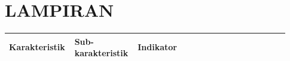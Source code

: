 
\appendix
\chapter*{LAMPIRAN}

\label{annex:kisi-kisi-instrumen}

\begin{longtable}{|p{0.2\linewidth}|p{0.2\linewidth}|p{0.53\linewidth}|}
      \hline
      \multicolumn{1}{|m{0.2\linewidth}|}{\textbf{Karakteristik}} & \multicolumn{1}{m{0.2\linewidth}|}{\textbf{Sub-karakteristik}}                                                                                          & \multicolumn{1}{m{0.53\linewidth}|}{\textbf{Indikator}}                                                                                                                                                                                                                                                                                                                                                                                                                                                                                                                                                                                                                                                                                                                                                                                                                                                                                                                                                                                                                                                                                                                                                                                                                                                                                                                                                                               \\    \hline
      \endfirsthead


\end{longtable}
